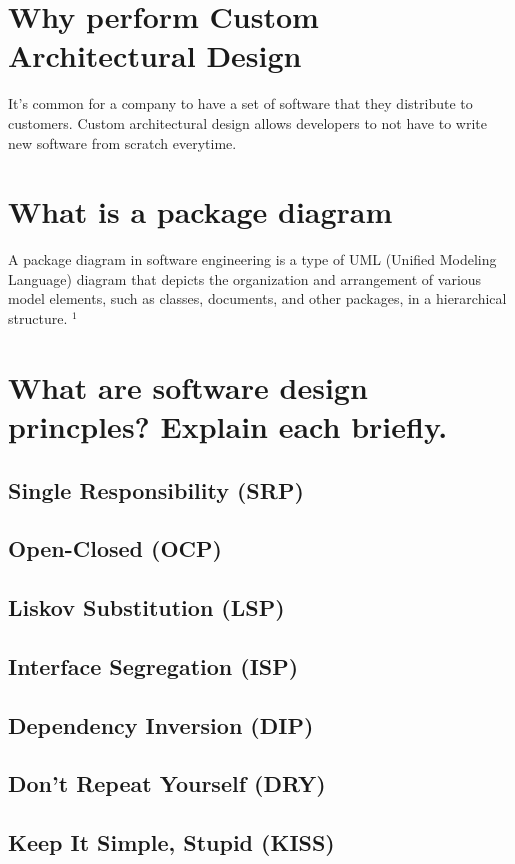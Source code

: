 \section{Why perform Custom Architectural Design}
It's common for a company to have a set of software that they distribute to customers. Custom architectural design allows developers to not have to write new software from scratch everytime.  

\section{What is a package diagram}
A package diagram in software engineering is a type of UML (Unified Modeling Language) diagram that depicts the organization and arrangement of various model elements, such as classes, documents, and other packages, in a hierarchical structure.
\href{https://www.lucidchart.com/pages/uml-package-diagram}{$^1$}

\section{What are software design princples? Explain each briefly.}
\subsection{Single Responsibility (SRP)}
\subsection{Open-Closed (OCP)}
\subsection{Liskov Substitution (LSP)}
\subsection{Interface Segregation (ISP)}
\subsection{Dependency Inversion (DIP)}
\subsection{Don't Repeat Yourself (DRY)}
\subsection{Keep It Simple, Stupid (KISS)}
